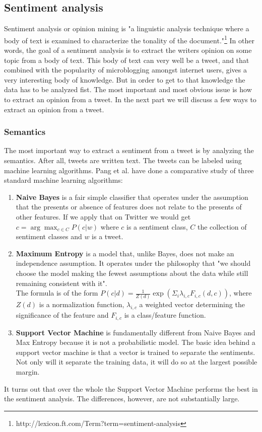 \documentclass{article}
\begin{document}
\subsection{Sentiment analysis}
Sentiment analysis or opinion mining is "a linguistic analysis technique where a body of text is examined to characterize the tonality of the document."\footnote{http://lexicon.ft.com/Term?term=sentiment-analysis} In other words, the goal of a sentiment analysis is to extract the writers opinion on some topic from a body of text. This body of text can very well be a tweet, and that combined with the popularity of microblogging amongst internet users, gives a very interesting body of knowledge. But in order to get to that knowledge the data has to be analyzed fist. 
The most important and most obvious issue is how to extract an opinion from a tweet. In the next part we will discuss a few ways to extract an opinion from a tweet.
\subsubsection{Semantics }
The most important way to extract a sentiment from a tweet is by analyzing the semantics. After all, tweets are written text. The tweets can be labeled using machine learning algorithms. Pang et al. \cite{machineLearning} have done a comparative study of three standard machine learning algorithms: 
\begin{enumerate}
\item \textbf{Naive Bayes} is a fair simple classifier that operates under the assumption that the presents or absence of features does not relate to the presents of other features. If we apply that on Twitter we would get $c = \arg\max_{c\in C} P(c|w)$ where $c$ is a sentiment class, $C$ the collection of sentiment classes and $w$ is a tweet. \cite{sentAnalysis}
\item \textbf{Maximum Entropy} is a model that, unlike Bayes, does not make an independence assumption. It operates under the philosophy that "we should choose the model making the fewest assumptions about the data while still remaining consistent with it".\cite{machineLearning} \\
The formula is of the form $P(c|d) = \frac{1}{Z(d)}\exp(\Sigma_i \lambda_{i,c}F_{i,c}(d,c))$, where $Z(d)$ is a normalization function, $\lambda_{i,c}$ a weighted vector determining the significance of the feature and $F_{i,c}$ is a class/feature function. 
\item \textbf{Support Vector Machine} is fundamentally different from Naive Bayes and Max Entropy because it is not a probabilistic model. The basic idea behind a support vector machine is that a vector is trained to separate the sentiments. Not only will it separate the training data, it will do so at the largest possible margin. 
\end{enumerate}
It turns out that over the whole the Support Vector Machine performs the best in the sentiment analysis\cite{machineLearning}. The differences, however, are not substantially large. 
\end{document}
